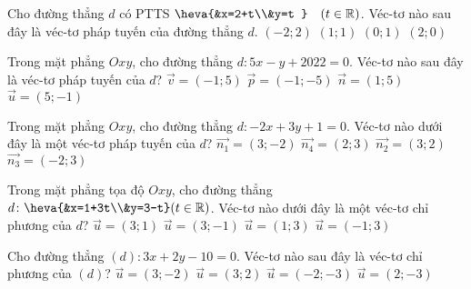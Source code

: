 \begin{ex}%
	Cho đường thẳng $d$ có PTTS $\heva{&x=2+t\\&y=t }\quad (t\in \mathbb{R})$. Véc-tơ nào sau đây là véc-tơ pháp tuyến của đường thẳng $d$.
	\choice
	{\True $(-2;2)$}
	{$(1;1)$}
	{$(0;1)$}
	{$(2;0)$}
\end{ex}


\begin{ex}%
	Trong mặt phẳng $Oxy$, cho đường thẳng $d\colon 5x-y+2022=0$. Véc-tơ nào sau đây là véc-tơ pháp tuyến của $d$?
	\choice
	{$\overrightarrow{v}=\left(-1;5\right)$}
	{$\overrightarrow{p}=\left(-1;-5\right)$}
	{$\overrightarrow{n}=\left(1;5\right)$}
	{\True $\overrightarrow{u}=\left(5;-1\right)$}
\end{ex}


\begin{ex}%
	Trong mặt phẳng $Oxy$, cho đường thẳng $d: -2x+3y+1=0$. Véc-tơ nào dưới đây là một véc-tơ pháp tuyến của $d$?
	\choice
	{$\overrightarrow{n_1}=(3;-2)$}
	{$\overrightarrow{n_4}=(2;3)$}
	{$\overrightarrow{n_2}=(3;2)$}
	{\True $\overrightarrow{n_3}=(-2;3)$}
\end{ex}


\begin{ex}%
	Trong mặt phẳng tọa độ $O x y$, cho đường thẳng $d\colon \heva{&x=1+3t\\&y=3-t} (t \in \mathbb{R})$. Véc-tơ nào dưới đây là một véc-tơ chỉ phương của $d$?
	\choice
	{$\overrightarrow{u}=(3; 1)$}
	{\True $\overrightarrow{u}=(3;-1)$}
	{$\overrightarrow{u}=(1; 3)$}
	{$\overrightarrow{u}=(-1; 3)$}
	\loigiai{
	}
\end{ex}


\begin{ex}%
	Cho đường thẳng $(d)\colon 3x+2y-10=0$. Véc-tơ  nào sau đây là véc-tơ chỉ phương của $(d)$?
	\choice
	{$\overrightarrow{u}=(3;-2) $}
	{$\overrightarrow{u}=(3;2) $}
	{$\overrightarrow{u}=(-2;-3) $}
	{\True $\overrightarrow{u}=(2;-3) $}
\end{ex}


